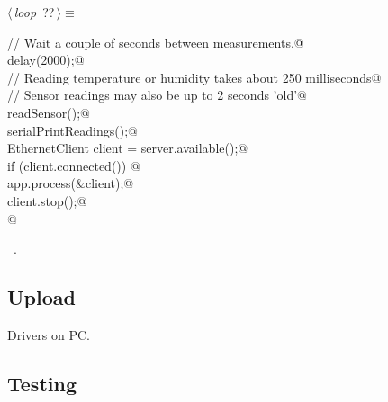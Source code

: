 \documentclass[a4paper, 12pt]{article}
\begin{document}
\begin{flushleft} \small
\begin{minipage}{\linewidth}\label{scrap8}\raggedright\small
{}$\langle\,${\itshape loop}\nobreak\ {\footnotesize{??}}$\,\rangle\equiv$
\vspace{-1ex}
\begin{list}{}{\setlength{\leftmargin}{1em}} \item
\mbox{}\verb@  // Wait a couple of seconds between measurements.@\\
\mbox{}\verb@  delay(2000);@\\
\mbox{}\verb@  // Reading temperature or humidity takes about 250 milliseconds@\\
\mbox{}\verb@  // Sensor readings may also be up to 2 seconds 'old'@\\
\mbox{}\verb@  readSensor();@\\
\mbox{}\verb@  serialPrintReadings();@\\
\mbox{}\verb@  EthernetClient client = server.available();@\\
\mbox{}\verb@  if (client.connected()) {@\\
\mbox{}\verb@    app.process(&client);@\\
\mbox{}\verb@    client.stop();@\\
\mbox{}\verb@  }@\\
\mbox{}{\NWsep}
\end{list}
\vspace{-1ex}
\vspace{-1ex}
\footnotesize
\begin{list}{}{\setlength{\itemsep}{-\parsep}\setlength{\itemindent}{-\leftmargin}}
\item \NWtxtMacroRefIn\ .
\end{list}
\end{minipage}
\end{flushleft}

\subsection{Upload}

Drivers on PC.



\subsection{Testing}
\end{document}
